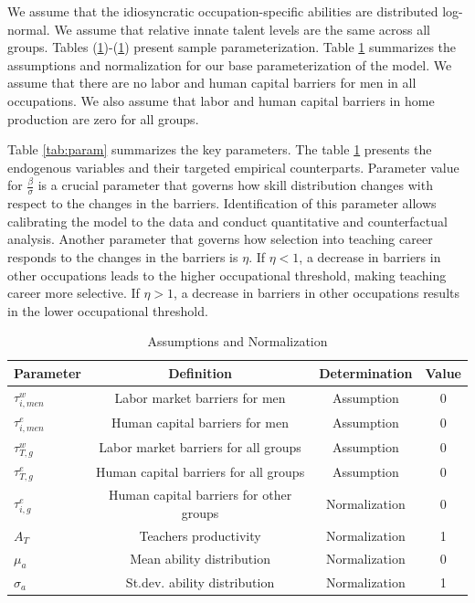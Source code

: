 \documentclass[onehalfspacing,11pt]{article}
\begin{document}
We assume that the idiosyncratic occupation-specific abilities are distributed log-normal. We assume that relative innate talent levels are the same across all groups. Tables (\ref{tab:assump})-(\ref{tab:assump}) present sample parameterization. Table \ref{tab:assump} summarizes the assumptions and normalization for our base parameterization of the model. We assume that there are no labor and human capital barriers for men in all occupations. We also assume that labor and human capital barriers in home production are zero for all groups.

Table \ref{tab:param} summarizes the key parameters. The table \ref{tab:assump} presents the endogenous variables and their targeted empirical counterparts. Parameter value for $\frac{\beta}{\sigma}$ is a crucial parameter that governs how skill distribution changes with respect to the changes in the barriers. Identification of this parameter allows calibrating the model to the data and conduct quantitative and counterfactual analysis. Another parameter that governs how selection into teaching career responds to the changes in the barriers is $\eta$. If $\eta<1$, a decrease in barriers in other occupations leads to the higher occupational threshold, making teaching career more selective. If $\eta>1$, a decrease in barriers in other occupations results in the lower occupational threshold.

	\begin{table}[h!]
		\centering
		\begin{tabular}{lccc}
			\toprule
			\toprule
			Parameter & Definition & Determination & Value\\
			\midrule
			$\tau^{w}_{i,men}$ & Labor market barriers for men & Assumption & 0\\
			$\tau^{e}_{i,men}$ & Human capital barriers for men & Assumption & 0\\
			$\tau^{w}_{T,g}$ & Labor market barriers for all groups & Assumption & 0\\
			$\tau^{e}_{T,g}$ & Human capital barriers for all groups & Assumption & 0\\
			$\tau^{e}_{i,g}$ & Human capital barriers for other groups & Normalization & 0\\
			$A_{T}$ & Teachers productivity & Normalization & 1\\
			$\mu_a$ & Mean ability distribution & Normalization & 0\\
			$\sigma_a$ & St.dev. ability distribution & Normalization & 1\\
			\bottomrule
		\end{tabular}
		\caption{Assumptions and Normalization}
		\label{tab:assump}
	\end{table}
	
\end{document}

